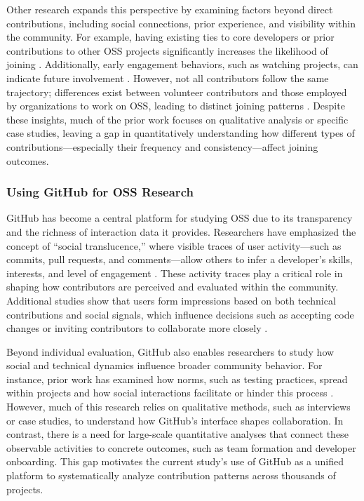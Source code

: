 Other research expands this perspective by examining factors beyond direct contributions, including social connections, prior experience, and visibility within the community. For example, having existing ties to core developers or prior contributions to other OSS projects significantly increases the likelihood of joining \cite{16_SinhaMS11,17_CasalnuovoVDF15}. Additionally, early engagement behaviors, such as watching projects, can indicate future involvement \cite{18_SheoranBKDE14}. However, not all contributors follow the same trajectory; differences exist between volunteer contributors and those employed by organizations to work on OSS, leading to distinct joining patterns \cite{19_HerraizRARG06}. Despite these insights, much of the prior work focuses on qualitative analysis or specific case studies, leaving a gap in quantitatively understanding how different types of contributions—especially their frequency and consistency—affect joining outcomes.

\subsubsection{Using GitHub for OSS Research}
GitHub has become a central platform for studying OSS due to its transparency and the richness of interaction data it provides. Researchers have emphasized the concept of “social translucence,” where visible traces of user activity—such as commits, pull requests, and comments—allow others to infer a developer's skills, interests, and level of engagement \cite{20_DabbishSTH12}. These activity traces play a critical role in shaping how contributors are perceived and evaluated within the community. Additional studies show that users form impressions based on both technical contributions and social signals, which influence decisions such as accepting code changes or inviting contributors to collaborate more closely \cite{21_MarlowDH13}.

Beyond individual evaluation, GitHub also enables researchers to study how social and technical dynamics influence broader community behavior. For instance, prior work has examined how norms, such as testing practices, spread within projects and how social interactions facilitate or hinder this process \cite{22_PhamSLFS13}. However, much of this research relies on qualitative methods, such as interviews or case studies, to understand how GitHub's interface shapes collaboration. In contrast, there is a need for large-scale quantitative analyses that connect these observable activities to concrete outcomes, such as team formation and developer onboarding. This gap motivates the current study's use of GitHub as a unified platform to systematically analyze contribution patterns across thousands of projects.

